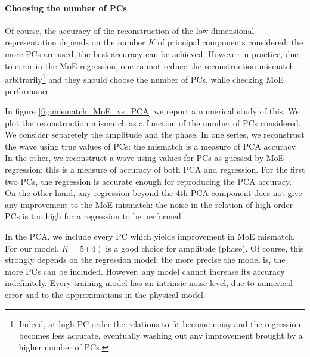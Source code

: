 \paragraph{Choosing the number of PCs}
Of course, the accuracy of the reconstruction of the low dimensional representation depends on the number $K$ of principal components considered: the more PCs are used, the best accuracy can be achieved.
However in practice, due to error in the MoE regression, one cannot reduce the reconstruction mismatch
arbitrarily\footnote{Indeed, at high PC order the relations to fit become noisy and the regression becomes less accurate, eventually washing out any improvement brought by a higher number of PCs.}
and they should choose the number of PCs, while checking MoE performance.
\par
In figure \ref{fig:mismatch_MoE_vs_PCA} we report a numerical study of this. We plot the reconstruction mismatch as a function of the number of PCs considered. We consider separetely the amplitude and the phase. In one series, we reconstruct the wave using true values of PCs: the mismatch is a measure of PCA accuracy. In the other, we reconstruct a wave using values for PCs as guessed by MoE regression: this is a measure of accuracy of both PCA and regression.
For the first two PCs, the regression is accurate enough for reproducing the PCA accuracy.
On the other hand, any regression beyond the 4th PCA component does not give any improvement to the MoE mismatch: the noise in the relation of high order PCs is too high for a regression to be performed.
\par
In the PCA, we include every PC which yields improvement in MoE mismatch. For our model, $K = 5(4)$ is a good choice for amplitude (phase).
Of course, this strongly depends on the regression model: the more precise the model is, the more PCs can be included.
However, any model cannot increase its accuracy indefinitely. Every training model has an intrinsic noise level, due to numerical error and to the approximations in the physical model.
